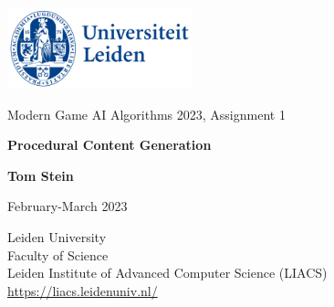 \begin{titlepage}
    \includegraphics[width=0.4\textwidth]{images/universiteit-leiden-logo.png}

    \begin{center}
        \vspace{3.5cm} \LARGE Modern Game AI Algorithms 2023, Assignment 1

        \vspace{0.5cm} \huge \textbf{Procedural Content Generation}

        \vspace{5cm} \textbf{Tom Stein}

        \vspace{0.25cm} \Large February-March 2023
    \end{center}

    \vspace{5.2cm} 
    
    \vspace{1cm} \noindent Leiden University \\
    Faculty of Science \\
    Leiden Institute of Advanced Computer Science (LIACS) \\ 
    \url{https://liacs.leidenuniv.nl/}

    
\end{titlepage}

